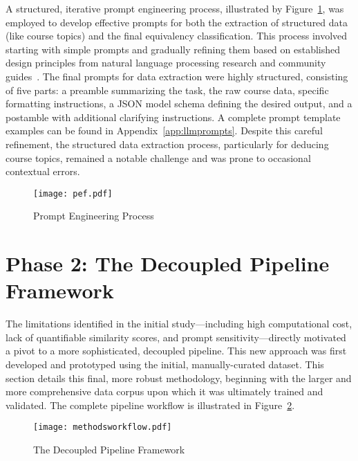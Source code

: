 A structured, iterative prompt engineering process, illustrated by Figure~\ref{fig:prompt_engineering_process}, was employed to develop effective prompts for both the extraction of structured data (like course topics) and the final equivalency classification. This process involved starting with simple prompts and gradually refining them based on established design principles from natural language processing research and community guides~\cite{ye2024promptengineeringpromptengineer,ppp,peg}. The final prompts for data extraction were highly structured, consisting of five parts: a preamble summarizing the task, the raw course data, specific formatting instructions, a JSON model schema defining the desired output, and a postamble with additional clarifying instructions. A complete prompt template examples can be found in Appendix~\ref{app:llmprompts}. Despite this careful refinement, the structured data extraction process, particularly for deducing course topics, remained a notable challenge and was prone to occasional contextual errors.

\begin{figure}[tb]
    \captionsetup{skip=5pt}
    \centering
    \texttt{[image: pef.pdf]}
    \caption{Prompt Engineering Process}
    \label{fig:prompt_engineering_process}
\end{figure}

\section{Phase 2: The Decoupled Pipeline Framework}\label{ch:3.2}
The limitations identified in the initial study—including high computational cost, lack of quantifiable similarity scores, and prompt sensitivity—directly motivated a pivot to a more sophisticated, decoupled pipeline. This new approach was first developed and prototyped using the initial, manually-curated dataset. This section details this final, more robust methodology, beginning with the larger and more comprehensive data corpus upon which it was ultimately trained and validated.  The complete pipeline workflow is illustrated in Figure~\ref{fig:ftpipeline}.

\begin{figure}[tb]
    \captionsetup{skip=5pt}
    \centering
    \texttt{[image: methodsworkflow.pdf]}
    \caption{The Decoupled Pipeline Framework}
    \label{fig:ftpipeline}
\end{figure}

